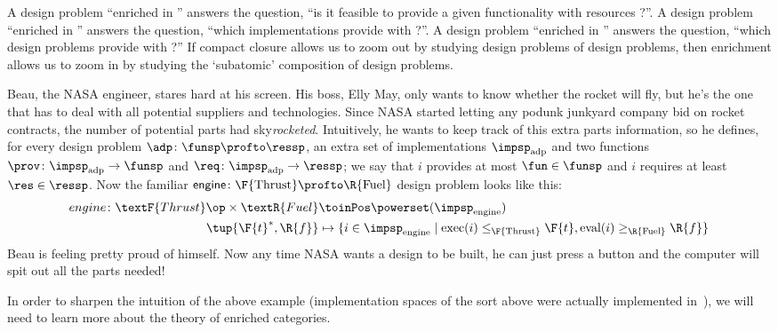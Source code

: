 \label{sec:enriched}
A design problem ``enriched in \Bool'' answers the question, ``is it feasible to provide a given functionality \fun with resources \res?''. A design problem ``enriched in \Set'' answers the question, ``which implementations provide \fun with \res?''. A design problem ``enriched in \DP'' answers the question, ``which design problems provide \fun with \res?'' If compact closure allows us to zoom out by studying design problems of design problems, then enrichment allows us to zoom in by studying the `subatomic' composition of design problems.

\begin{example}
    \label{ex:dpi_example}
    Beau, the NASA engineer, stares hard at his screen. His boss, Elly May, only wants to know whether the rocket will fly, but he's the one that has to deal with all potential suppliers and technologies. Since NASA started letting any podunk junkyard company bid on rocket contracts, the number of potential parts had sky\emph{rocketed}. Intuitively, he wants to keep track of this extra parts information, so he defines, for every design problem $\adp \colon \funsp \profto \ressp$, an extra set of implementations $\impsp_\text{adp}$ and two functions $\prov\colon \impsp_\text{adp} \to \funsp$ and  $\req\colon \impsp_\text{adp} \to \ressp$; we say that $i$ provides at most $\fun \in \funsp$ and $i$ requires at least $\res \in \ressp$. Now the familiar $\mathsf{engine} \colon \F{\text{Thrust}} \profto \R{\text{Fuel}}$ design problem looks like this:
    \begin{equation*}
        \begin{aligned}
            engine \colon \textF{Thrust}\op \times \textR{Fuel} &\toinPos \powerset(\impsp_\text{engine}) \\
            \tup{\F{t}^*,\R{f}} &\mapsto \{ i \in \impsp_\text{engine} \mid \text{exec}(i) \leq_\F{\text{Thrust}} \F{t}, \text{eval}(i) \geq_\R{\text{Fuel}} \R{f} \}
        \end{aligned}
    \end{equation*}
    Beau is feeling pretty proud of himself. Now any time NASA wants a design to be built, he can just press a button and the computer will spit out all the parts needed!
\end{example}

In order to sharpen the intuition of the above example (implementation spaces of the sort above were actually implemented in~\cite{censi}), we will need to learn more about the theory of enriched categories.


